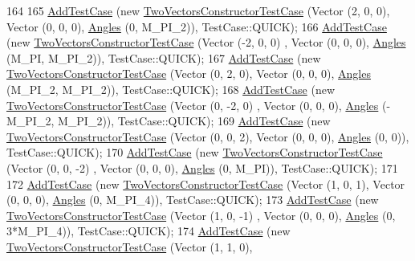 \begin{DoxyCode}
164 
165   \hyperlink{classns3_1_1TestCase_a3718088e3eefd5d6454569d2e0ddd835}{AddTestCase} (\textcolor{keyword}{new} \hyperlink{classTwoVectorsConstructorTestCase}{TwoVectorsConstructorTestCase} (Vector (2, 0, 0),
           Vector (0, 0, 0), \hyperlink{structns3_1_1Angles}{Angles} (0, M\_PI\_2)), TestCase::QUICK);
166   \hyperlink{classns3_1_1TestCase_a3718088e3eefd5d6454569d2e0ddd835}{AddTestCase} (\textcolor{keyword}{new} \hyperlink{classTwoVectorsConstructorTestCase}{TwoVectorsConstructorTestCase} (Vector (-2, 0, 0)
      ,    Vector (0, 0, 0), \hyperlink{structns3_1_1Angles}{Angles} (M\_PI, M\_PI\_2)), TestCase::QUICK);
167   \hyperlink{classns3_1_1TestCase_a3718088e3eefd5d6454569d2e0ddd835}{AddTestCase} (\textcolor{keyword}{new} \hyperlink{classTwoVectorsConstructorTestCase}{TwoVectorsConstructorTestCase} (Vector (0, 2, 0),
           Vector (0, 0, 0), \hyperlink{structns3_1_1Angles}{Angles} (M\_PI\_2, M\_PI\_2)), TestCase::QUICK);
168   \hyperlink{classns3_1_1TestCase_a3718088e3eefd5d6454569d2e0ddd835}{AddTestCase} (\textcolor{keyword}{new} \hyperlink{classTwoVectorsConstructorTestCase}{TwoVectorsConstructorTestCase} (Vector (0, -2, 0)
      ,    Vector (0, 0, 0), \hyperlink{structns3_1_1Angles}{Angles} (-M\_PI\_2, M\_PI\_2)), TestCase::QUICK);
169   \hyperlink{classns3_1_1TestCase_a3718088e3eefd5d6454569d2e0ddd835}{AddTestCase} (\textcolor{keyword}{new} \hyperlink{classTwoVectorsConstructorTestCase}{TwoVectorsConstructorTestCase} (Vector (0, 0, 2),
           Vector (0, 0, 0), \hyperlink{structns3_1_1Angles}{Angles} (0, 0)), TestCase::QUICK);
170   \hyperlink{classns3_1_1TestCase_a3718088e3eefd5d6454569d2e0ddd835}{AddTestCase} (\textcolor{keyword}{new} \hyperlink{classTwoVectorsConstructorTestCase}{TwoVectorsConstructorTestCase} (Vector (0, 0, -2)
      ,    Vector (0, 0, 0), \hyperlink{structns3_1_1Angles}{Angles} (0, M\_PI)), TestCase::QUICK);
171 
172   \hyperlink{classns3_1_1TestCase_a3718088e3eefd5d6454569d2e0ddd835}{AddTestCase} (\textcolor{keyword}{new} \hyperlink{classTwoVectorsConstructorTestCase}{TwoVectorsConstructorTestCase} (Vector (1, 0, 1),
           Vector (0, 0, 0), \hyperlink{structns3_1_1Angles}{Angles} (0, M\_PI\_4)), TestCase::QUICK);
173   \hyperlink{classns3_1_1TestCase_a3718088e3eefd5d6454569d2e0ddd835}{AddTestCase} (\textcolor{keyword}{new} \hyperlink{classTwoVectorsConstructorTestCase}{TwoVectorsConstructorTestCase} (Vector (1, 0, -1)
      ,    Vector (0, 0, 0), \hyperlink{structns3_1_1Angles}{Angles} (0, 3*M\_PI\_4)), TestCase::QUICK);
174   \hyperlink{classns3_1_1TestCase_a3718088e3eefd5d6454569d2e0ddd835}{AddTestCase} (\textcolor{keyword}{new} \hyperlink{classTwoVectorsConstructorTestCase}{TwoVectorsConstructorTestCase} (Vector (1, 1, 0),

\end{DoxyCode}

